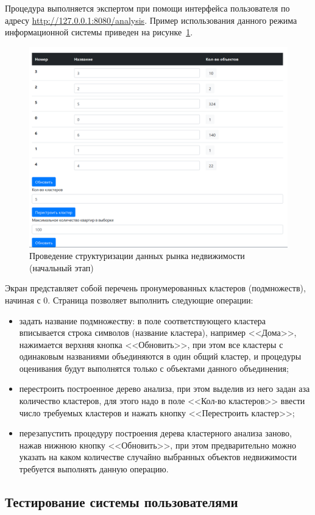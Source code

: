 \documentclass[a4paper,14pt,openany,final]{extreport} %
\def\oldcaption{} \let\oldcaption=\caption
\def\caption{\stepcounter{captionsnum}\oldcaption}
\begin{document}
Процедура выполняется экспертом при помощи интерфейса пользователя по адресу \url{http://127.0.0.1:8080/analysis}. Пример использования данного режима информационной системы приведен на рисунке~\ref{fig:exclus1}.
\begin{figure}[htbp]
  \centering
  \includegraphics[width=0.8\linewidth]{screen-cluster-start.png}
  \caption{Проведение структуризации данных рынка недвижимости (начальный этап)}
  \label{fig:exclus1}
\end{figure}

Экран представляет собой перечень пронумерованных кластеров (подмножеств), начиная с 0.  Страница позволяет выполнить следующие операции:
\begin{itemize}
\item задать название подмножеству: в поле соответствующего кластера вписывается строка символов (название кластера), например <<Дома>>, нажимается верхняя кнопка <<Обновить>>, при этом все кластеры с одинаковым названиями объединяются в один общий кластер, и процедуры оценивания будут выполнятся только с объектами данного объединения;
\item перестроить построенное дерево анализа, при этом выделив из него задан аза количество кластеров, для этого надо в поле <<Кол-во кластеров>> ввести число требуемых кластеров и нажать кнопку <<Перестроить кластер>>;
\item перезапустить процедуру построения дерева кластерного анализа заново, нажав нижнюю кнопку <<Обновить>>, при этом предварительно можно указать на каком количестве случайно выбранных объектов недвижимости требуется выполнять данную операцию.
\end{itemize}

\subsection{Тестирование системы пользователями}
\end{document}
